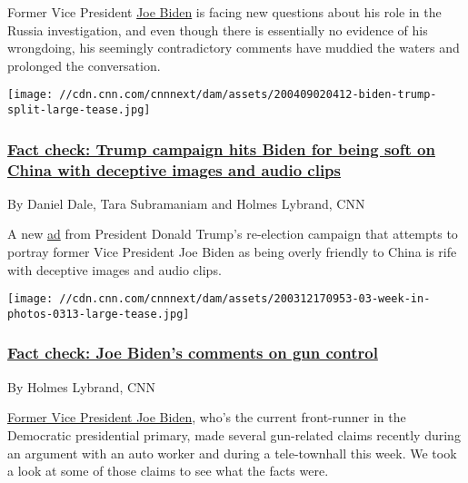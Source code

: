 Former Vice President
\href{https://www.cnn.com/election/2020/candidate/biden}{Joe Biden} is
facing new questions about his role in the Russia investigation, and
even though there is essentially no evidence of his wrongdoing, his
seemingly contradictory comments have muddied the waters and prolonged
the conversation.

\href{/2020/04/10/politics/trump-campaign-ad-joe-biden-fact-check/index.html}{}

\texttt{[image: //cdn.cnn.com/cnnnext/dam/assets/200409020412-biden-trump-split-large-tease.jpg]}

\hypertarget{fact-check-trump-campaign-hits-biden-for-being-soft-on-china-with-deceptive-images-and-audio-clips}{%
\subsubsection{\texorpdfstring{\href{/2020/04/10/politics/trump-campaign-ad-joe-biden-fact-check/index.html}{Fact
check: Trump campaign hits Biden for being soft on China with deceptive
images and audio
clips}}{Fact check: Trump campaign hits Biden for being soft on China with deceptive images and audio clips}}\label{fact-check-trump-campaign-hits-biden-for-being-soft-on-china-with-deceptive-images-and-audio-clips}}

By Daniel Dale, Tara Subramaniam and Holmes Lybrand, CNN

A new \href{https://www.youtube.com/watch?v=Nv7yVCwv6NU}{ad} from
President Donald Trump's re-election campaign that attempts to portray
former Vice President Joe Biden as being overly friendly to China is
rife with deceptive images and audio clips.

\href{/2020/03/21/politics/fact-check-joe-biden-gun-control/index.html}{}

\texttt{[image: //cdn.cnn.com/cnnnext/dam/assets/200312170953-03-week-in-photos-0313-large-tease.jpg]}

\hypertarget{fact-check-joe-bidens-comments-on-gun-control}{%
\subsubsection{\texorpdfstring{\href{/2020/03/21/politics/fact-check-joe-biden-gun-control/index.html}{Fact
check: Joe Biden's comments on gun
control}}{Fact check: Joe Biden's comments on gun control}}\label{fact-check-joe-bidens-comments-on-gun-control}}

By Holmes Lybrand, CNN

\href{https://www.cnn.com/election/2020/candidate/biden}{Former Vice
President Joe Biden}, who's the current front-runner in the Democratic
presidential primary, made several gun-related claims recently during an
argument with an auto worker and during a tele-townhall this week. We
took a look at some of those claims to see what the facts were.

